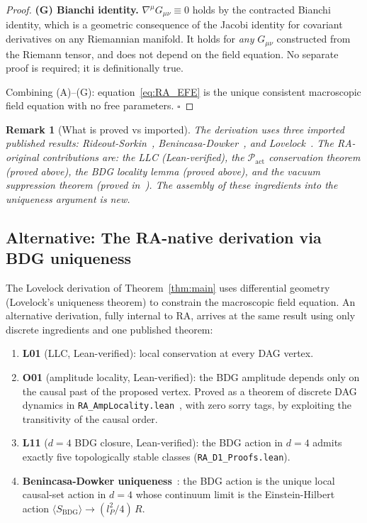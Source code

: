 \documentclass[11pt,a4paper]{article}
\newtheorem{remark}[theorem]{Remark}
\newcommand{\Pact}{\mathcal{P}_{\mathrm{act}}}
\newcommand{\SBDG}{S_{\mathrm{BDG}}}
\begin{document}
\begin{proof}
\medskip
\textbf{(G) Bianchi identity.}
$\nabla^\mu G_{\mu\nu} \equiv 0$ holds by the contracted Bianchi
identity, which is a geometric consequence of the Jacobi identity for
covariant derivatives on any Riemannian manifold. It holds for
\emph{any} $G_{\mu\nu}$ constructed from the Riemann tensor, and does
not depend on the field equation. No separate proof is required; it
is definitionally true.

\medskip
Combining (A)--(G): equation~\eqref{eq:RA_EFE} is the unique
consistent macroscopic field equation with no free parameters.
\hfill$\square$
\end{proof}

\begin{remark}[What is proved vs imported]
The derivation uses three imported published results:
Rideout-Sorkin~\citep{RideoutSorkin2000}, Benincasa-Dowker~\citep{Benincasa2010},
and Lovelock~\citep{Lovelock1971}. The RA-original contributions are:
the LLC (Lean-verified), the $\Pact$ conservation theorem (proved
above), the BDG locality lemma (proved above), and the vacuum
suppression theorem (proved in~\citep{Sandeman2026RAGC}).
The assembly of these ingredients into the uniqueness argument is new.
\end{remark}

\subsection{Alternative: The RA-native derivation via BDG uniqueness}
\label{sec:ra_native}

The Lovelock derivation of Theorem~\ref{thm:main} uses differential
geometry (Lovelock's uniqueness theorem) to constrain the macroscopic
field equation. An alternative derivation, fully internal to RA, arrives
at the same result using only discrete ingredients and one published
theorem:

\begin{enumerate}[nosep]
\item \textbf{L01} (LLC, Lean-verified): local conservation at every DAG
  vertex.
\item \textbf{O01} (amplitude locality, Lean-verified): the BDG amplitude
  depends only on the causal past of the proposed vertex. Proved as a
  theorem of discrete DAG dynamics in
  \texttt{RA\_AmpLocality.lean}~\citep{Sandeman2026AmpLoc}, with zero
  sorry tags, by exploiting the transitivity of the causal order.
\item \textbf{L11} ($d=4$ BDG closure, Lean-verified): the BDG action
  in $d=4$ admits exactly five topologically stable classes
  (\texttt{RA\_D1\_Proofs.lean}).
\item \textbf{Benincasa-Dowker uniqueness}~\citep{Benincasa2010}: the
  BDG action is the unique local causal-set action in $d=4$ whose
  continuum limit is the Einstein-Hilbert action
  $\langle\SBDG\rangle \to (l_P^2/4)\,R$.
\end{enumerate}
\end{document}
